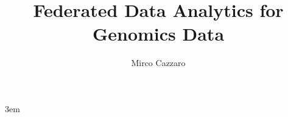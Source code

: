 \documentclass{DEIThesis}
\title{Federated Data Analytics for Genomics Data}
\author{Mirco Cazzaro}
\begin{document}
\emergencystretch 3em
    \frontmatter

    \mainmatter
    
    
    
    
    
    
    
    
    
    
    \backmatter
\end{document}
